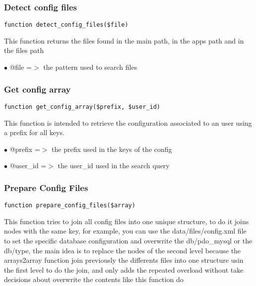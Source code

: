 \documentclass[a4paper]{article}
\begin{document}
\hypertarget{toc81}{}
\subsubsection{Detect config files}

\begin{lstlisting}
function detect_config_files($file)
\end{lstlisting}

This function returns the files found in the main path, in the apps path and in the files path

\begin{compactitem}
\item[\color{myblue}$\bullet$] @file =$>$ the pattern used to search files
\end{compactitem}

\hypertarget{toc82}{}
\subsubsection{Get config array}

\begin{lstlisting}
function get_config_array($prefix, $user_id)
\end{lstlisting}

This function is intended to retrieve the configuration associated to an user
using a prefix for all keys.

\begin{compactitem}
\item[\color{myblue}$\bullet$] @prefix  =$>$ the prefix used in the keys of the config
\item[\color{myblue}$\bullet$] @user\_id =$>$ the user\_id used in the search query
\end{compactitem}

\hypertarget{toc83}{}
\subsubsection{Prepare Config Files}

\begin{lstlisting}
function prepare_config_files($array)
\end{lstlisting}

This function tries to join all config files into one unique structure, to do it
joins nodes with the same key, for example, you can use the data/files/config.xml
file to set the specific database configuration and overwrite the db/pdo\_mysql or
the db/type, the main idea is to replace the nodes of the second level because the
arrays2array function join previously the differents files into one structure usin
the first level to do the join, and only adds the repeated overload without take
decisions about overwrite the contents like this function do
\end{document}
